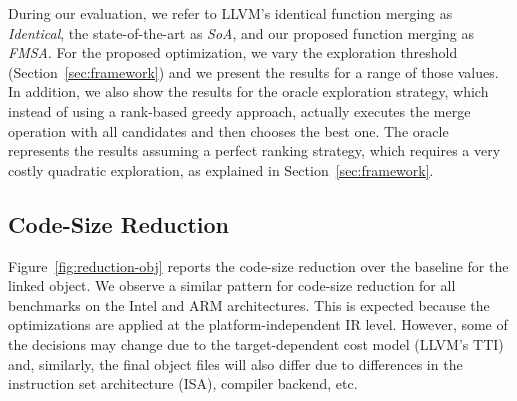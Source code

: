 During our evaluation, we refer to LLVM's identical function merging as \textit{Identical}, the state-of-the-art as \textit{SoA}, and our
proposed function merging as \textit{FMSA}. For the proposed optimization, we vary the exploration threshold (Section~\ref{sec:framework})
and we present the results for a range of those values. In addition, we also show the results for the oracle exploration strategy, which
instead of using a rank-based greedy approach, actually executes the merge operation with all candidates and then chooses the best one.
The oracle represents the results assuming a perfect ranking strategy, which requires a very costly quadratic exploration, as explained in
Section~\ref{sec:framework}. 

\subsection{Code-Size Reduction}



Figure~\ref{fig:reduction-obj} reports the code-size reduction over the baseline for the linked object. %
We observe a similar pattern for code-size reduction for all benchmarks on the Intel and ARM architectures. This is expected because the
optimizations are applied at the platform-independent IR level. However, some of the decisions may change due to the target-dependent cost
model (LLVM's TTI) and, similarly, the final object files will also differ due to differences in the instruction set architecture (ISA),
compiler backend, etc.

